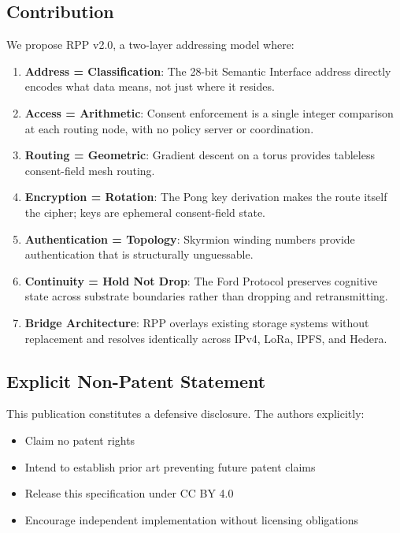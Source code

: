 \documentclass[11pt,a4paper]{article}
\begin{document}
\subsection{Contribution}

We propose RPP v2.0, a two-layer addressing model where:

\begin{enumerate}
    \item \textbf{Address = Classification}: The 28-bit Semantic Interface address directly encodes what data means, not just where it resides.
    \item \textbf{Access = Arithmetic}: Consent enforcement is a single integer comparison at each routing node, with no policy server or coordination.
    \item \textbf{Routing = Geometric}: Gradient descent on a torus provides tableless consent-field mesh routing.
    \item \textbf{Encryption = Rotation}: The Pong key derivation makes the route itself the cipher; keys are ephemeral consent-field state.
    \item \textbf{Authentication = Topology}: Skyrmion winding numbers provide authentication that is structurally unguessable.
    \item \textbf{Continuity = Hold Not Drop}: The Ford Protocol preserves cognitive state across substrate boundaries rather than dropping and retransmitting.
    \item \textbf{Bridge Architecture}: RPP overlays existing storage systems without replacement and resolves identically across IPv4, LoRa, IPFS, and Hedera.
\end{enumerate}

\subsection{Explicit Non-Patent Statement}

This publication constitutes a defensive disclosure. The authors explicitly:
\begin{itemize}
    \item Claim no patent rights
    \item Intend to establish prior art preventing future patent claims
    \item Release this specification under CC BY 4.0
    \item Encourage independent implementation without licensing obligations
\end{itemize}
\end{document}
